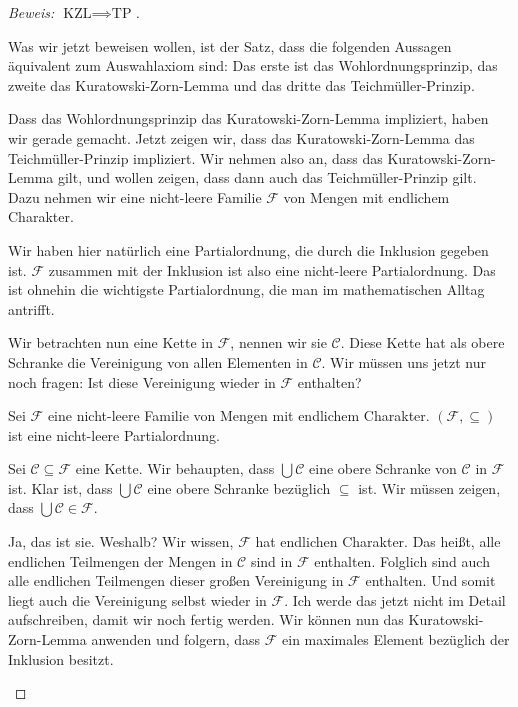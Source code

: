 \begin{proof}[Beweis: $\text{KZL} \implies \text{TP}$]
\begin{spoken-clean}[01:00:30 - 01:03:00]
Was wir jetzt beweisen wollen, ist der Satz, dass die folgenden Aussagen äquivalent zum Auswahlaxiom sind: Das erste ist das Wohlordnungsprinzip, das zweite das Kuratowski-Zorn-Lemma und das dritte das Teichmüller-Prinzip. 

Dass das Wohlordnungsprinzip das Kuratowski-Zorn-Lemma impliziert, haben wir gerade gemacht. Jetzt zeigen wir, dass das Kuratowski-Zorn-Lemma das Teichmüller-Prinzip impliziert. Wir nehmen also an, dass das Kuratowski-Zorn-Lemma gilt, und wollen zeigen, dass dann auch das Teichmüller-Prinzip gilt. Dazu nehmen wir eine nicht-leere Familie $\mathcal{F}$ von Mengen mit endlichem Charakter.

Wir haben hier natürlich eine Partialordnung, die durch die Inklusion gegeben ist. $\mathcal{F}$ zusammen mit der Inklusion ist also eine nicht-leere Partialordnung. Das ist ohnehin die wichtigste Partialordnung, die man im mathematischen Alltag antrifft.

Wir betrachten nun eine Kette in $\mathcal{F}$, nennen wir sie $\mathcal{C}$. Diese Kette hat als obere Schranke die Vereinigung von allen Elementen in $\mathcal{C}$. Wir müssen uns jetzt nur noch fragen: Ist diese Vereinigung wieder in $\mathcal{F}$ enthalten?
\end{spoken-clean}

\begin{math-stroke}
Sei $\mathcal{F}$ eine nicht-leere Familie von Mengen mit endlichem Charakter.
$(\mathcal{F}, \subseteq)$ ist eine nicht-leere Partialordnung.

Sei $\mathcal{C} \subseteq \mathcal{F}$ eine Kette.
Wir behaupten, dass $\bigcup \mathcal{C}$ eine obere Schranke von $\mathcal{C}$ in $\mathcal{F}$ ist.
Klar ist, dass $\bigcup \mathcal{C}$ eine obere Schranke bezüglich $\subseteq$ ist. Wir müssen zeigen, dass $\bigcup \mathcal{C} \in \mathcal{F}$.
\end{math-stroke}

\begin{spoken-clean}[01:03:00 - 01:05:00]
Ja, das ist sie. Weshalb? Wir wissen, $\mathcal{F}$ hat endlichen Charakter. Das heißt, alle endlichen Teilmengen der Mengen in $\mathcal{C}$ sind in $\mathcal{F}$ enthalten. Folglich sind auch alle endlichen Teilmengen dieser großen Vereinigung in $\mathcal{F}$ enthalten. Und somit liegt auch die Vereinigung selbst wieder in $\mathcal{F}$. Ich werde das jetzt nicht im Detail aufschreiben, damit wir noch fertig werden. Wir können nun das Kuratowski-Zorn-Lemma anwenden und folgern, dass $\mathcal{F}$ ein maximales Element bezüglich der Inklusion besitzt.
\end{spoken-clean}


\end{proof}
